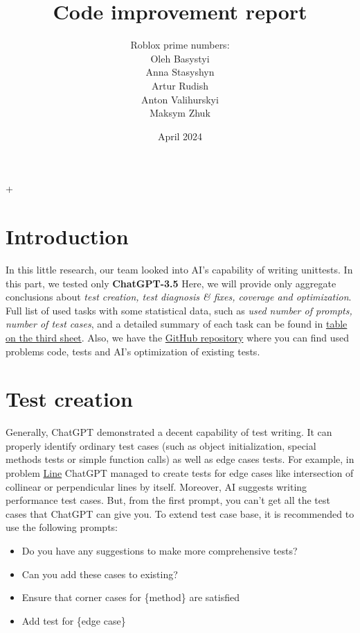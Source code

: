 \documentclass[12pt]{report}
\title{Code improvement report}
\author{Roblox prime numbers:\\\small{Oleh Basystyi}\\\small{Anna Stasyshyn}
	\\\small{Artur Rudish}\\\small{Anton Valihurskyi}\\\small{Maksym Zhuk}}
\date{April 2024}
\begin{document}
	\maketitle
	\renewcommand{\thesection}{\arabic{section}}+
	\section{Introduction}

			In this little research, our team looked into AI’s capability of writing unittests.
In this part, we tested only \textbf{ChatGPT-3.5} Here, we will provide only aggregate
conclusions about \textit{test creation, test diagnosis \& fixes, coverage and optimization}. Full list of
used tasks with some statistical data, such as \textit{used number of prompts, number of test cases}, and a detailed summary of each task can be found in
		\href{https://docs.google.com/spreadsheets/d/1qXPyAJsOOpmtxIoGqObwG5mTaLU3IWO0SQRGbjZPhEc/edit#gid=0}{table on the third sheet}. Also, we have the \href{https://github.com/n1n1n1q/Ai-benchmark/tree/main/Ai-tests/Tests-Writing}{GitHub repository} where you can find used problems code, tests and AI's optimization of existing tests.

	\section{Test creation}
		Generally, ChatGPT demonstrated a decent capability of test writing. It can properly identify ordinary test cases (such as object initialization, special methods tests or simple function calls) as well as edge cases tests.
For example, in problem \href{https://cms.ucu.edu.ua/mod/vpl/view.php?id=356223}{Line} ChatGPT managed to create tests for edge cases like intersection of collinear or perpendicular lines by itself. Moreover, AI suggests
writing performance test cases. But, from the first prompt, you can't get all the test cases that ChatGPT can give you.
To extend test case base, it is recommended to use the following prompts:

		\begin{itemize}
			\item Do you have any suggestions to make more comprehensive tests?
			\item Can you add these cases to existing?
			\item Ensure that corner cases for \{method\} are satisfied
			\item Add test for \{edge case\}
		\end{itemize}
\end{document}

